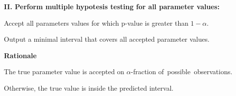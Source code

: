 \documentclass[landscape,footrule]{foils}
\begin{document}
\textbf{II. Perform multiple hypotesis testing for all parameter values:}
\begin{triangles}
\item Accept all parameters values for which p-value is greater than $1-\alpha$.  
\item Output a minimal interval that covers all accepted parameter values.
\end{triangles}
\vspace*{1cm}

\textbf{Rationale}
\begin{triangles}
\item The true parameter value is accepted on $\alpha$-fraction of~possible~observations.
\item Otherwise, the true value is inside the predicted interval. 
\end{triangles}
\end{document}
